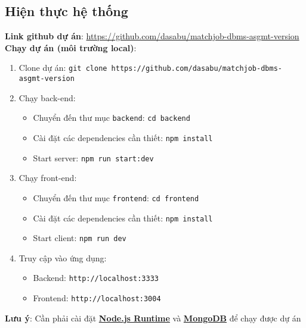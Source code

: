 \subsection{Hiện thực hệ thống}

\textbf{Link github dự án}: \href{https://github.com/dasabu/matchjob-dbms-asgmt-version}{https://github.com/dasabu/matchjob-dbms-asgmt-version}\\

\textbf{Chạy dự án (môi trường local)}:
\begin{enumerate}
    \item Clone dự án: \texttt{git clone https://github.com/dasabu/matchjob-dbms-asgmt-version}
    \item Chạy back-end:
    \begin{itemize}
        \item Chuyển đến thư mục \texttt{backend}: \texttt{cd backend}
        \item Cài đặt các dependencies cần thiết: \texttt{npm install}
        \item Start server: \texttt{npm run start:dev}
    \end{itemize}
    \item Chạy front-end:
    \begin{itemize}
        \item Chuyển đến thư mục \texttt{frontend}: \texttt{cd frontend}
        \item Cài đặt các dependencies cần thiết: \texttt{npm install}
        \item Start client:
        \texttt{npm run dev}
    \end{itemize}

    \item Truy cập vào ứng dụng:
    \begin{itemize}
        \item Backend: \texttt{http://localhost:3333}
        \item Frontend: \texttt{http://localhost:3004}
    \end{itemize}
\end{enumerate}

\textbf{Lưu ý}: Cần phải cài đặt \href{https://nodejs.org/en}{\textbf{Node.js Runtime}} và \href{https://www.mongodb.com/docs/manual/installation/}{\textbf{MongoDB}} để chạy được dự án

% 

% 

% 

% 

% 

% 

% 

% 

% 